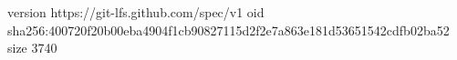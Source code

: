 version https://git-lfs.github.com/spec/v1
oid sha256:400720f20b00eba4904f1cb90827115d2f2e7a863e181d53651542cdfb02ba52
size 3740
